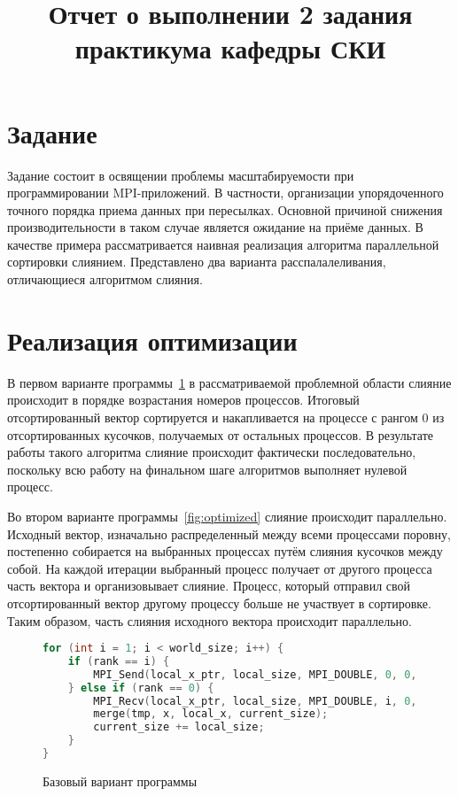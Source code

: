 \documentclass[12pt, oneside, a4paper]{article}
\begin{document}
\title{Отчет о выполнении 2 задания практикума кафедры СКИ}

\section{Задание}

Задание состоит в освящении проблемы масштабируемости при программировании MPI-приложений. В частности, организации упорядоченного точного порядка приема данных при пересылках. Основной причиной снижения производительности в таком случае является ожидание на приёме данных. В качестве примера рассматривается наивная реализация алгоритма параллельной сортировки слиянием. Представлено два варианта расспалалеливания, отличающиеся алгоритмом слияния.

\section{Реализация оптимизации}

В первом варианте программы~\ref{fig:base} в рассматриваемой проблемной области слияние происходит в порядке возрастания номеров процессов. Итоговый отсортированный вектор сортируется и накапливается на процессе с рангом 0 из отсортированных кусочков, получаемых от остальных процессов. В результате работы такого алгоритма слияние происходит фактически последовательно, поскольку всю работу на финальном шаге алгоритмов выполняет нулевой процесс.

Во втором варианте программы~\ref{fig:optimized} слияние происходит параллельно. Исходный вектор, изначально распределенный между всеми процессами поровну, постепенно собирается на выбранных процессах путём слияния кусочков между собой. На каждой итерации выбранный процесс получает от другого процесса часть вектора и организовывает слияние. Процесс, который отправил свой отсортированный вектор другому процессу больше не участвует в сортировке. Таким образом, часть слияния исходного вектора происходит параллельно.

\begin{figure}[h]
\begin{lstlisting}[language=C++]
for (int i = 1; i < world_size; i++) {
	if (rank == i) {
		MPI_Send(local_x_ptr, local_size, MPI_DOUBLE, 0, 0, MPI_COMM_WORLD);
	} else if (rank == 0) {
		MPI_Recv(local_x_ptr, local_size, MPI_DOUBLE, i, 0, MPI_COMM_WORLD, &Stat);
		merge(tmp, x, local_x, current_size);
		current_size += local_size;
	}
}
\end{lstlisting}
\caption{Базовый вариант программы}
\label{fig:base}
\end{figure}
\end{document}
